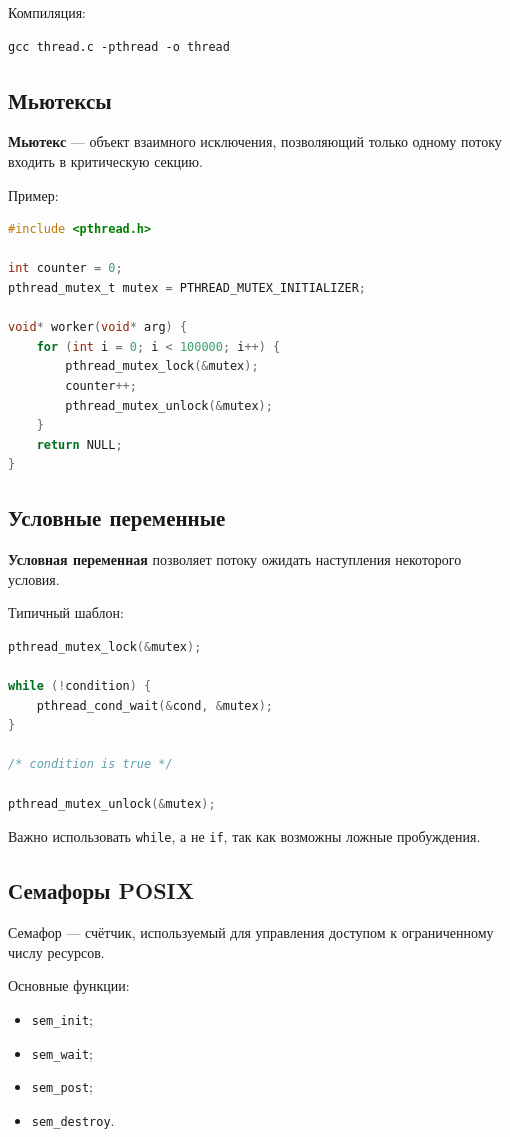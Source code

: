 \documentclass[12pt,a4paper]{article}
\begin{document}
Компиляция:

\begin{lstlisting}
gcc thread.c -pthread -o thread
\end{lstlisting}

\subsection{Мьютексы}

\textbf{Мьютекс} --- объект взаимного исключения, позволяющий только одному потоку входить в критическую секцию.

Пример:

\begin{lstlisting}[language=C]
#include <pthread.h>

int counter = 0;
pthread_mutex_t mutex = PTHREAD_MUTEX_INITIALIZER;

void* worker(void* arg) {
    for (int i = 0; i < 100000; i++) {
        pthread_mutex_lock(&mutex);
        counter++;
        pthread_mutex_unlock(&mutex);
    }
    return NULL;
}
\end{lstlisting}

\subsection{Условные переменные}

\textbf{Условная переменная} позволяет потоку ожидать наступления некоторого условия.

Типичный шаблон:

\begin{lstlisting}[language=C]
pthread_mutex_lock(&mutex);

while (!condition) {
    pthread_cond_wait(&cond, &mutex);
}

/* condition is true */

pthread_mutex_unlock(&mutex);
\end{lstlisting}

Важно использовать \texttt{while}, а не \texttt{if}, так как возможны ложные пробуждения.

\subsection{Семафоры POSIX}

Семафор --- счётчик, используемый для управления доступом к ограниченному числу ресурсов.

Основные функции:
\begin{itemize}
    \item \texttt{sem\_init};
    \item \texttt{sem\_wait};
    \item \texttt{sem\_post};
    \item \texttt{sem\_destroy}.
\end{itemize}
\end{document}
